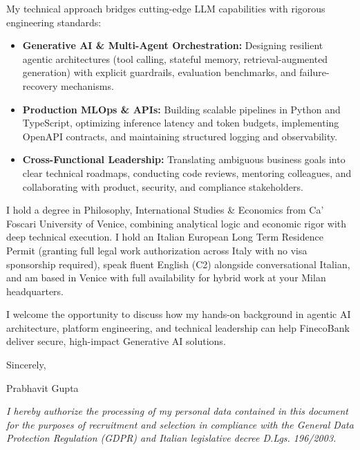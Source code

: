 \documentclass[10.5pt,a4paper]{article}
\begin{document}
My technical approach bridges cutting-edge LLM capabilities with rigorous engineering standards:
\begin{itemize}
 \setlength{\itemsep}{1pt}
 \setlength{\parskip}{0pt}
 \item \textbf{Generative AI \& Multi-Agent Orchestration:} Designing resilient agentic architectures (tool calling, stateful memory, retrieval-augmented generation) with explicit guardrails, evaluation benchmarks, and failure-recovery mechanisms.
 \item \textbf{Production MLOps \& APIs:} Building scalable pipelines in Python and TypeScript, optimizing inference latency and token budgets, implementing OpenAPI contracts, and maintaining structured logging and observability.
 \item \textbf{Cross-Functional Leadership:} Translating ambiguous business goals into clear technical roadmaps, conducting code reviews, mentoring colleagues, and collaborating with product, security, and compliance stakeholders.
\end{itemize}

I hold a degree in Philosophy, International Studies \& Economics from Ca' Foscari University of Venice, combining analytical logic and economic rigor with deep technical execution. I hold an Italian European Long Term Residence Permit (granting full legal work authorization across Italy with no visa sponsorship required), speak fluent English (C2) alongside conversational Italian, and am based in Venice with full availability for hybrid work at your Milan headquarters.

I welcome the opportunity to discuss how my hands-on background in agentic AI architecture, platform engineering, and technical leadership can help FinecoBank deliver secure, high-impact Generative AI solutions.

Sincerely,

Prabhavit Gupta

\vspace{0.6em}
{\footnotesize \textit{I hereby authorize the processing of my personal data contained in this document for the purposes of recruitment and selection in compliance with the General Data Protection Regulation (GDPR) and Italian legislative decree D.Lgs. 196/2003.}\par}
\end{document}
